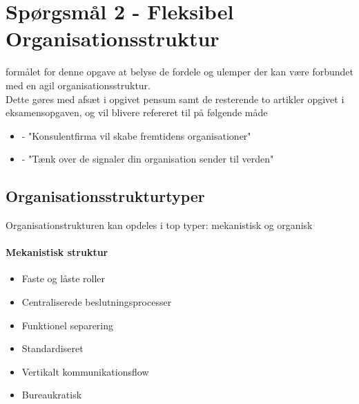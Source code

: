 \section{Spørgsmål 2 - Fleksibel Organisationsstruktur}
formålet for denne opgave at belyse de fordele og ulemper der kan være forbundet med en agil organisationsstruktur.
\\Dette gøres med afsæt i opgivet pensum samt de resterende to artikler opgivet i eksamensopgaven, og vil blivere refereret til på følgende måde
\begin{itemize}
    \item \cite[a.4]{eksamensopgave} - "Konsulentfirma vil skabe fremtidens organisationer"
    \item \cite[a.5]{eksamensopgave} - "Tænk over de signaler din organisation sender til verden"
\end{itemize}
\subsection{Organisationsstrukturtyper}
Organisationstrukturen kan opdeles i top typer: mekanistisk og organisk
\paragraph{Mekanistisk struktur}
\begin{itemize}
    \item Faste og låste roller
    \item Centraliserede beslutningsprocesser
    \item Funktionel separering
    \item Standardiseret
    \item Vertikalt kommunikationsflow
    \item Bureaukratisk
\end{itemize}
